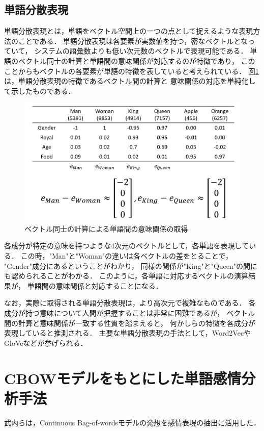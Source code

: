 	\subsection{単語分散表現}
		単語分散表現とは，単語をベクトル空間上の一つの点として捉えるような表現方法のことである．
		単語分散表現は各要素が実数値を持つ，密なベクトルとなっていて，
		システムの語彙数よりも低い次元数のベクトルで表現可能である．
		単語のベクトル同士の計算と単語間の意味関係が対応するのが特徴であり，
		このことからもベクトルの各要素が単語の特徴を表していると考えられている．
		図\ref{fig:word2vec}は，単語分散表現の特徴であるベクトル間の計算と
		意味関係の対応を単純化して示したものである．
		
		\begin{figure}[H]
			\centering
			\includegraphics[width=\linewidth]{./figure/word2vec.png}
			\caption{ベクトル同士の計算による単語間の意味関係の取得}
			\label{fig:word2vec}
		\end{figure}

		各成分が特定の意味を持つような4次元のベクトルとして，各単語を表現している．
		この時，"Man"と"Woman"の違いは各ベクトルの差をとることで，
		"Gender"成分にあるということがわかり，
		同様の関係が"King"と"Queen"の間にも認められることがわかる．
		このように，各単語に対応するベクトルの演算結果が，
		単語間の意味関係と対応することになる．
		
		なお，実際に取得される単語分散表現は，より高次元で複雑なものである．
		各成分が持つ意味について人間が把握することは非常に困難であるが，
		ベクトル間の計算と意味関係が一致する性質を踏まえると，
		何かしらの特徴を各成分が表現していると推測される．
		主要な単語分散表現の手法として，Word2Vec\cite{word2vec}やGloVe\cite{glove}などが挙げられる．

\section{CBOWモデルをもとにした単語感情分析手法}
	武内ら\cite{takeuchi}は，Continuous Bag-of-wordsモデルの発想を感情表現の抽出に活用した．

